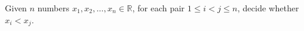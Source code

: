\begin{problem}[Sorting]
	Given \(n\) numbers \(x_1, x_2, \ldots, x_n \in \mathbb{R}\),
	for each pair \(1 \leq i < j \leq n\),
	decide whether \(x_i < x_j\).
\end{problem}
